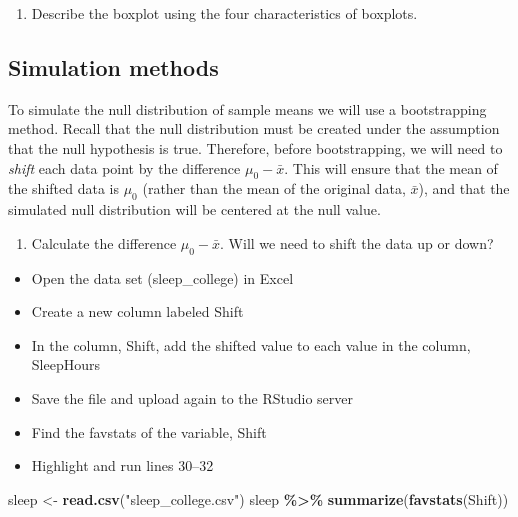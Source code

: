 \documentclass[
]{report}
\newenvironment{Shaded}{\begin{snugshade}}{\end{snugshade}}
\newcommand{\FunctionTok}[1]{\textcolor[rgb]{0.13,0.29,0.53}{\textbf{#1}}}
\newcommand{\NormalTok}[1]{#1}
\newcommand{\OtherTok}[1]{\textcolor[rgb]{0.56,0.35,0.01}{#1}}
\newcommand{\SpecialCharTok}[1]{\textcolor[rgb]{0.81,0.36,0.00}{\textbf{#1}}}
\newcommand{\StringTok}[1]{\textcolor[rgb]{0.31,0.60,0.02}{#1}}
\providecommand{\tightlist}{%
  \setlength{\itemsep}{0pt}\setlength{\parskip}{0pt}}
\begin{document}
\begin{enumerate}
\def\labelenumi{\arabic{enumi}.}
\setcounter{enumi}{4}
\tightlist
\item
  Describe the boxplot using the four characteristics of boxplots.
\end{enumerate}

\vspace{1in}

\subsection*{Simulation methods}\label{simulation-methods}

To simulate the null distribution of sample means we will use a bootstrapping method. Recall that the null distribution must be created under the assumption that the null hypothesis is true. Therefore, before bootstrapping, we will need to \emph{shift} each data point by the difference \(\mu_0 - \bar{x}\). This will ensure that the mean of the shifted data is \(\mu_0\) (rather than the mean of the original data, \(\bar{x}\)), and that the simulated null distribution will be centered at the null value.

\begin{enumerate}
\def\labelenumi{\arabic{enumi}.}
\setcounter{enumi}{5}
\tightlist
\item
  Calculate the difference \(\mu_0 - \bar{x}\). Will we need to shift the data up or down?
\end{enumerate}

\vspace{0.3in}

\begin{itemize}
\item
  Open the data set (sleep\_college) in Excel
\item
  Create a new column labeled Shift
\item
  In the column, Shift, add the shifted value to each value in the column, SleepHours
\item
  Save the file and upload again to the RStudio server
\item
  Find the favstats of the variable, Shift
\item
  Highlight and run lines 30--32
\end{itemize}

\begin{Shaded}
\begin{Highlighting}[]
\NormalTok{sleep }\OtherTok{\textless{}{-}} \FunctionTok{read.csv}\NormalTok{(}\StringTok{"sleep\_college.csv"}\NormalTok{)}
\NormalTok{sleep }\SpecialCharTok{\%\textgreater{}\%}
    \FunctionTok{summarize}\NormalTok{(}\FunctionTok{favstats}\NormalTok{(Shift))}
\end{Highlighting}
\end{Shaded}
\end{document}
